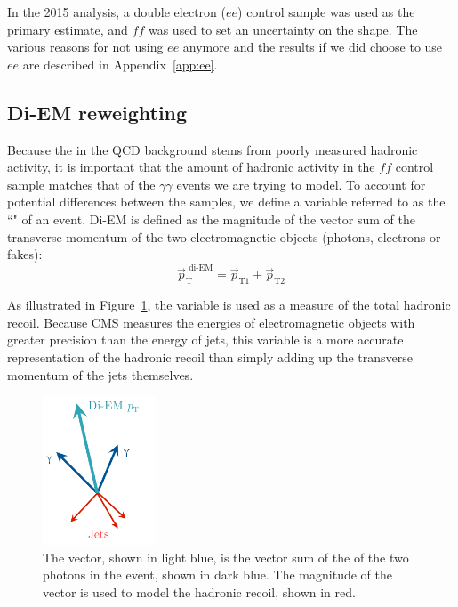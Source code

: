 In the 2015 analysis, a double electron ($ee$) control sample was used as the primary estimate, and $ff$ was used to set an uncertainty on the \ETmiss shape. The various reasons for not using $ee$ anymore and the results if we did choose to use $ee$ are described in Appendix~\ref{app:ee}.

\subsection{Di-EM \pT reweighting}
\label{sec:diempt}

Because the \ETmiss in the QCD background stems from poorly measured hadronic activity, it is important that the amount of hadronic activity in the $ff$ control sample matches that of the $\gamma\gamma$ events we are trying to model.
To account for potential differences between the samples, we define a variable referred to as the ``\diempt" of an event. Di-EM \pT is defined as the magnitude of
the vector sum of the transverse momentum of the two electromagnetic objects (photons, electrons or fakes):
\begin{equation}
 \vec{p}_\mathrm{T}^{\, \,\mathrm{di\mbox{-}EM}}=\vec{p}_{\mathrm{T}1}+\vec{p}_{\mathrm{T}2}
 \label{equ:diempt}
\end{equation}

As illustrated in Figure~\ref{fig:diempt}, the \diempt variable is used as a measure of the total hadronic recoil. Because CMS measures the energies of electromagnetic objects with greater precision than the energy of jets, this variable is a more accurate representation of the hadronic recoil than simply adding up the transverse momentum of the jets themselves. 

\begin{figure}[h]
\begin{center}
\includegraphics[width=0.3\textwidth]{Figures/DataAnalysis/Diempt.pdf}
\end{center}
\caption{The \diempt vector, shown in light blue, is the vector sum of the \pT of the two photons in the event, shown in dark blue. The magnitude of the \diempt vector is used to model the hadronic recoil, shown in red. }
\label{fig:diempt}
\end{figure}

